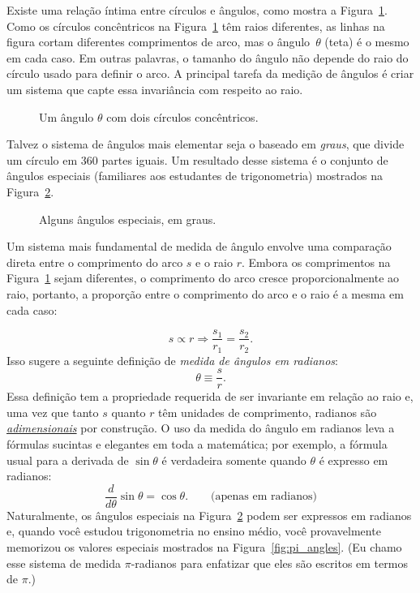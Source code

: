 {Existe uma relação íntima entre círculos e ângulos, como mostra a Figura~\ref{fig:angle_arclength}. Como os círculos concêntricos na Figura~\ref{fig:angle_arclength} têm raios diferentes, as linhas na figura cortam diferentes comprimentos de arco, mas o ângulo~$\theta$ (teta) é o mesmo em cada caso. Em outras palavras, o tamanho do ângulo não depende do raio do círculo usado para definir o arco. A principal tarefa da medição de ângulos é criar um sistema que capte essa invariância com respeito ao raio.

\begin{figure}
\begin{center}
\end{center}
\caption{Um ângulo $\theta$ com dois círculos concêntricos.\label{fig:angle_arclength}}
\end{figure}

Talvez o sistema de ângulos mais elementar seja o baseado em \emph{graus}, que divide um círculo em 360 partes iguais. Um resultado desse sistema é o conjunto de ângulos especiais (familiares aos estudantes de trigonometria) mostrados na Figura~\ref{fig:degree_angles}.

\begin{figure}
\begin{center}
\end{center}
\caption{Alguns ângulos especiais, em graus.\label{fig:degree_angles}}
\end{figure}

Um sistema mais fundamental de medida de ângulo envolve uma comparação direta entre o comprimento do arco $s$ e o raio $r$. Embora os comprimentos na Figura~\ref{fig:angle_arclength} sejam diferentes, o comprimento do arco cresce proporcionalmente ao raio, portanto, a proporção entre o comprimento do arco e o raio é a mesma em cada caso:

\[
s\propto r \Rightarrow \frac{s_1}{r_1} = \frac{s_2}{r_2}.
\]
Isso sugere a seguinte definição de \emph{medida de ângulos em radianos}:
\begin{equation}
\label{eq:radians}
\theta \equiv \frac{s}{r}.
\end{equation}
Essa definição tem a propriedade requerida de ser invariante em relação ao raio e, uma vez que tanto $s$ quanto $r$ têm unidades de comprimento, radianos são \href{https://pt.wikipedia.org/wiki/Magnitude_adimensional}{\emph{adimensionais}} por construção. O uso da medida do ângulo em radianos leva a fórmulas sucintas e elegantes em toda a matemática; por exemplo, a fórmula usual para a derivada de $\sin\theta$ é verdadeira somente quando $\theta$ é expresso em radianos:
\[
  \frac{d}{d\theta}\sin\theta = \cos\theta. \qquad\mbox{(apenas em radianos)}
\]
Naturalmente, os ângulos especiais na Figura~\ref{fig:degree_angles} podem ser expressos em radianos e, quando você estudou trigonometria no ensino médio, você provavelmente memorizou os valores especiais mostrados na Figura~\ref{fig:pi_angles}. (Eu chamo esse sistema de medida $\pi$-radianos para enfatizar que eles são escritos em termos de $\pi$.)


}
